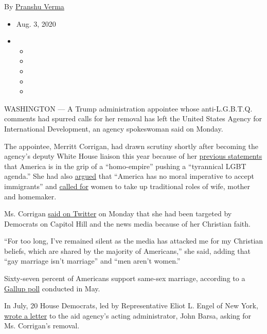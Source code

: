 By \href{https://www.nytimes3xbfgragh.onion/by/pranshu-verma}{Pranshu
Verma}

\begin{itemize}
\item
  Aug. 3, 2020
\item
  \begin{itemize}
  \item
  \item
  \item
  \item
  \item
  \end{itemize}
\end{itemize}

WASHINGTON --- A Trump administration appointee whose anti-L.G.B.T.Q.
comments had spurred calls for her removal has left the United States
Agency for International Development, an agency spokeswoman said on
Monday.

The appointee, Merritt Corrigan, had drawn scrutiny shortly after
becoming the agency's deputy White House liaison this year because of
her
\href{https://www.propublica.org/article/new-trump-appointee-to-foreign-aid-agency-has-denounced-liberal-democracy-and-our-homo-empire}{previous
statements} that America is in the grip of a ``homo-empire'' pushing a
``tyrannical LGBT agenda.'' She had also
\href{https://www.cnn.com/2020/06/29/politics/merritt-corrigan-usaid/index.html}{argued}
that ``America has no moral imperative to accept immigrants'' and
\href{https://conservativewoman.co.uk/home-where-women-will-find-true-liberation/}{called
for} women to take up traditional roles of wife, mother and homemaker.

Ms. Corrigan
\href{https://twitter.com/MerrittCorrigan/status/1290310476673347584?s=20}{said
on Twitter} on Monday that she had been targeted by Democrats on Capitol
Hill and the news media because of her Christian faith.

``For too long, I've remained silent as the media has attacked me for my
Christian beliefs, which are shared by the majority of Americans,'' she
said, adding that ``gay marriage isn't marriage'' and ``men aren't
women.''

Sixty-seven percent of Americans support same-sex marriage, according to
a
\href{https://news.gallup.com/poll/311672/support-sex-marriage-matches-record-high.aspx}{Gallup
poll} conducted in May.

In July, 20 House Democrats, led by Representative Eliot L. Engel of New
York,
\href{https://foreignaffairs.house.gov/_cache/files/5/1/51d34be5-55fb-46bc-b652-fa2e0f86209b/FBA263E0FD66495029120654978C46CE.7-22-2020-ele-letter-to-barsa-on-corrigan.pdf}{wrote
a letter} to the aid agency's acting administrator, John Barsa, asking
for Ms. Corrigan's removal.


